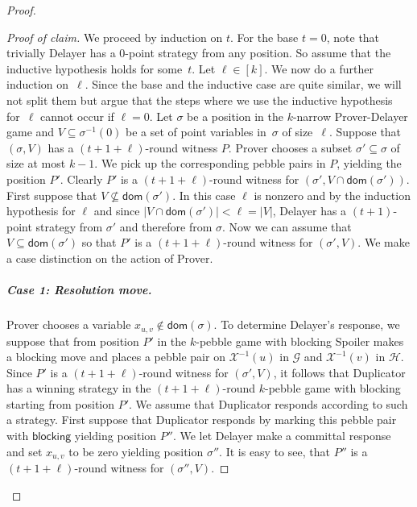 \documentclass[10pt,a4paper]{article}
\newcommand{\blocking}{\mathsf{blocking}}
\newcommand{\inv}[1]{#1^{-1}}
\newcommand{\graphG}{\mathcal{G}}
\newcommand{\graphH}{\mathcal{H}}
\newcommand{\dom}{\mathsf{dom}}
\newcommand{\X}{\mathcal{X}}
\newcommand{\XI}{\X^{-1}}
\newenvironment{claimproof}{\begin{proof}[Proof of claim]}{\end{proof}}
\begin{document}
\begin{proof}
\begin{claimproof}
We proceed by induction on $t$.
For the base $t=0$, note that trivially Delayer has a 0-point strategy from any position. So assume that the inductive hypothesis holds for some~$t$. Let $\ell \in [k]$.
We now do a further induction on~$\ell$.
Since the base and the inductive case are quite similar,
we will not split them but argue that the steps where we use the inductive hypothesis for~$\ell$ cannot occur if $\ell = 0$.
Let $\sigma$ be a position in the $k$-narrow Prover-Delayer game and $V\subseteq \inv{\sigma}(0)$ be a set of point variables in~$\sigma$ of size~$\ell$. Suppose that
$(\sigma,V)$ has a $(t+1+\ell)$-round witness $P$.
Prover chooses a subset $\sigma' \subseteq \sigma$ of size at most $k-1$. We pick up the corresponding pebble pairs in $P$, yielding the position $P'$. Clearly $P'$ is a $(t+1+\ell)$-round witness for $(\sigma',V \cap \dom(\sigma'))$.
%
%
%
%
%
First suppose that $V \not \subseteq \dom(\sigma')$. In this case
$\ell$ is nonzero and 
by the induction hypothesis for $\ell$ and since $|V \cap \dom(\sigma')|<\ell = |V|$, Delayer has a $(t+1)$-point strategy from $\sigma'$ and therefore from $\sigma$.
Now we can assume that $V \subseteq \dom(\sigma')$ so that $P'$ is a $(t+1+\ell)$-round witness for $(\sigma', V)$. We make a case distinction on the action of Prover.

\subparagraph{Case 1: Resolution move.} Prover chooses a variable $x_{u,v} \not \in \dom(\sigma)$. To determine Delayer's response, we suppose that from position $P'$ in the $k$-pebble game with blocking Spoiler makes a blocking move and
places a pebble pair on $\XI(u)$ in $\graphG$ and $\XI(v)$ in $\graphH$. Since $P'$ is a $(t+1+\ell)$-round witness for $(\sigma', V)$, it follows that Duplicator has a winning strategy in the $(t+1+\ell)$-round $k$-pebble game with blocking starting from position $P'$. We assume that Duplicator responds according to such a strategy. First suppose that Duplicator responds by marking this pebble pair with $\blocking$ yielding position $P''$. We let Delayer make a committal response and set $x_{u,v}$ to be zero yielding position $\sigma''$. It is easy to see, that $P''$ is a $(t+1+\ell)$-round witness for $(\sigma'', V)$.


\end{claimproof}
\end{proof}
\end{document}
